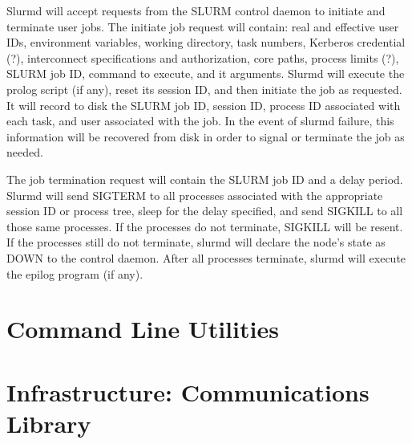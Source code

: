 Slurmd will accept requests from the SLURM control daemon 
to initiate and terminate user jobs. The initiate 
job request will contain: real and effective user IDs, 
environment variables, working directory, task numbers, 
Kerberos credential (?), interconnect specifications 
and authorization, core paths, process limits (?), SLURM job ID,
command to execute, and it arguments. Slurmd will 
execute the prolog script (if any), reset its session
ID, and then initiate the job as requested. It will 
record to disk the SLURM job ID, session ID, process ID associated 
with each task, and user associated with the job. 
In the event of slurmd failure, this information will 
be recovered from disk in order to signal or terminate 
the job as needed.


The job termination request will contain the SLURM job ID and 
a delay period. Slurmd will send SIGTERM to all processes associated 
with the appropriate session ID or process tree, sleep for the 
delay specified, and send SIGKILL to all those same processes. 
If the processes do not terminate, SIGKILL will be resent. 
If the processes still do not terminate, slurmd will declare 
the node's state as DOWN to the control daemon. After all 
processes terminate, slurmd will execute the epilog program 
(if any). 

\section{Command Line Utilities}

\section{Infrastructure: Communications Library}

